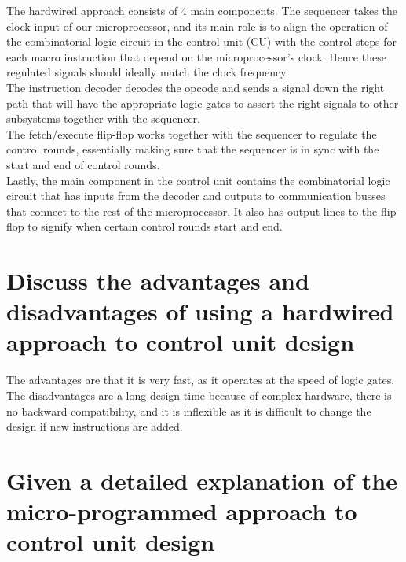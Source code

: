 \documentclass{article}
\begin{document}
The hardwired approach consists of 4 main components. The sequencer takes the
clock input of our microprocessor, and its main role is to align the operation
of the combinatorial logic circuit in the control unit (CU) with the control
steps for each macro instruction that depend on the microprocessor's clock.
Hence these regulated signals should ideally match the clock frequency. \\
The instruction decoder decodes the opcode and sends a signal down the right
path that will have the appropriate logic gates to assert the right signals to
other subsystems together with the sequencer. \\
The fetch/execute flip-flop works together with the sequencer to regulate the
control rounds, essentially making sure that the sequencer is in sync with the
start and end of control rounds.\\
Lastly, the main component in the control unit contains the combinatorial logic
circuit that has inputs from the decoder and outputs to communication busses
that connect to the rest of the microprocessor. It also has output lines to the
flip-flop to signify when certain control rounds start and end.

\section{Discuss the advantages and disadvantages of using a hardwired approach to control unit design}

The advantages are that it is very fast, as it operates at the speed of logic
gates. \\
The disadvantages are a long design time because of complex hardware, there is
no backward compatibility, and it is inflexible as it is difficult to change the
design if new instructions are added.

\section{Given a detailed explanation of the micro-programmed approach to control unit design}
\end{document}
